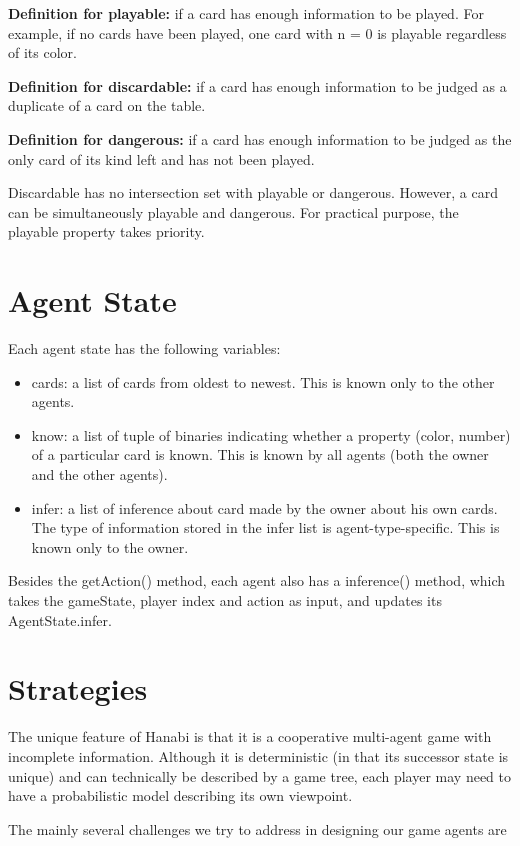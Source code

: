 \documentclass[12pt]{article}
\begin{document}
\textbf{Definition for playable:} if a card has enough information to be played. For example, if no cards have been played, one card with n = 0 is playable regardless of its color. 

\textbf{Definition for discardable:} if a card has enough information to be judged as a duplicate of a card on the table. 

\textbf{Definition for dangerous:} if a card has enough information to be judged as the only card of its kind left and has not been played.

Discardable has no intersection set with playable or dangerous. However, a card can be simultaneously playable and dangerous. For practical purpose, the playable property takes priority.

\section{Agent State}
Each agent state has the following variables:
\begin{itemize}
 \item cards: a list of cards from oldest to newest. This is known only to the other agents.
 \item know: a list of tuple of binaries indicating whether a property (color, number) of a particular card is known. This is known by all agents (both the owner and the other agents).
 \item infer: a list of inference about card made by the owner about his own cards. The type of information stored in the infer list is agent-type-specific. This is known only to the owner.
\end{itemize}

Besides the getAction() method, each agent also has a inference() method, which takes the gameState, player index and action as input, and updates its AgentState.infer.

\section{Strategies}
The unique feature of Hanabi is that it is a cooperative multi-agent game with incomplete information. Although it is deterministic (in that its successor state is unique) and can technically be described by a game tree, each player may need to have a probabilistic model describing its own viewpoint.

The mainly several challenges we try to address in designing our game agents are
\end{document}
